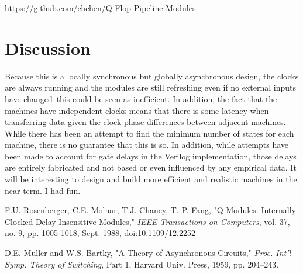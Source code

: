 \documentclass[10pt]{article}
\begin{document}
\url{https://github.com/chchen/Q-Flop-Pipeline-Modules}

\section{Discussion}

Because this is a locally synchronous but globally asynchronous design, the clocks are always running and the modules are still refreshing even if no external inputs have changed--this could be seen as inefficient. In addition, the fact that the machines have independent clocks means that there is some latency when transferring data given the clock phase differences between adjacent machines. While there has been an attempt to find the minimum number of states for each machine, there is no guarantee that this is so. In addition, while attempts have been made to account for gate delays in the Verilog implementation, those delays are entirely fabricated and not based or even influenced by any empirical data. It will be interesting to design and build more efficient and realistic machines in the near term. I had fun.

\begin{thebibliography}{9}

  F.U. Rosenberger, C.E. Molnar, T.J. Chaney, T.-P. Fang,
  "Q-Modules: Internally Clocked Delay-Insensitive Modules,"
  \emph{IEEE Transactions on Computers},
  vol. 37, no. 9, pp. 1005-1018, Sept. 1988, doi:10.1109/12.2252

  D.E. Muller and W.S. Bartky,
  "A Theory of Asynchronous Circuits,"
  \emph{Proc. Int'l Symp. Theory of Switching},
  Part 1, Harvard Univ. Press, 1959, pp. 204–243.

\end{thebibliography}
\end{document}

